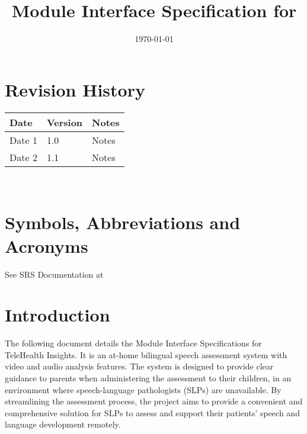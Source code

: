 \documentclass[12pt, titlepage]{article}
\begin{document}
\title{Module Interface Specification for \progname{}}

\author{\authname}

\date{\today}

\maketitle


\section{Revision History}

\begin{tabularx}{\textwidth}{p{3cm}p{2cm}X}
\toprule {\bf Date} & {\bf Version} & {\bf Notes}\\
\midrule
Date 1 & 1.0 & Notes\\
Date 2 & 1.1 & Notes\\
\bottomrule
\end{tabularx}

~\newpage

\section{Symbols, Abbreviations and Acronyms}

See SRS Documentation at 


\newpage

\tableofcontents

\newpage


\section{Introduction}

The following document details the Module Interface Specifications for TeleHealth Insights. It is an at-home bilingual speech 
assessment system with video and audio analysis features. The system is designed 
to provide clear guidance to parents when administering the assessment to their 
children, in an environment where speech-language pathologists (SLPs) are 
unavailable. By streamlining the assessment process, the project aims to provide a 
convenient and comprehensive solution for SLPs to assess and support their patients'
speech and language development remotely.
\end{document}
